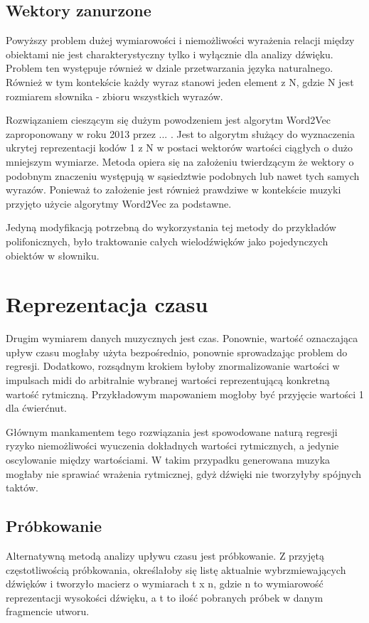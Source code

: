 {{        \subsection{Wektory zanurzone}
        {
            Powyższy problem dużej wymiarowości i niemożliwości wyrażenia relacji między obiektami nie jest
            charakterystyczny tylko i wyłącznie dla analizy dźwięku. Problem ten występuje również w dziale
            przetwarzania języka naturalnego. Również w tym kontekście każdy wyraz stanowi
            jeden element z N, gdzie N jest rozmiarem słownika - zbioru wszystkich wyrazów.

            Rozwiązaniem cieszącym się dużym powodzeniem jest algorytm Word2Vec zaproponowany w roku 2013 przez ... .
            Jest to algorytm służący do wyznaczenia ukrytej reprezentacji kodów 1 z N w postaci wektorów wartości ciągłych
            o dużo mniejszym wymiarze. Metoda opiera się na założeniu twierdzącym że wektory 
            o podobnym znaczeniu występują w sąsiedztwie podobnych lub nawet tych samych wyrazów. Ponieważ to założenie 
            jest również prawdziwe w kontekście muzyki przyjęto użycie algorytmy Word2Vec za podstawne.
            
            Jedyną modyfikacją potrzebną do wykorzystania tej metody do przykładów polifonicznych, było traktowanie 
            całych wielodźwięków jako pojedynczych obiektów w słowniku.
        }
    }

    \section{Reprezentacja czasu}
    {
        Drugim wymiarem danych muzycznych jest czas. Ponownie, wartość oznaczająca upływ czasu
        mogłaby użyta bezpośrednio, ponownie sprowadzając problem do regresji. Dodatkowo, rozsądnym krokiem
        byłoby znormalizowanie wartości w impulsach midi do arbitralnie wybranej wartości reprezentującą konkretną
        wartość rytmiczną. Przykładowym mapowaniem mogłoby być przyjęcie wartości 1 dla ćwierćnut.

        Głównym mankamentem tego rozwiązania jest spowodowane naturą regresji ryzyko niemożliwości wyuczenia 
        dokładnych wartości rytmicznych, a jedynie oscylowanie między wartościami. W takim przypadku generowana muzyka
        mogłaby nie sprawiać wrażenia rytmicznej, gdyż dźwięki nie tworzyłyby spójnych taktów. 

        \subsection{Próbkowanie}
        {
            Alternatywną metodą analizy upływu czasu jest próbkowanie. Z przyjętą częstotliwością próbkowania, 
            określałoby się listę aktualnie wybrzmiewających dźwięków i tworzyło macierz o wymiarach t x n, gdzie n to
            wymiarowość reprezentacji wysokości dźwięku, a t to ilość pobranych próbek w danym fragmencie utworu.
            
}}}
